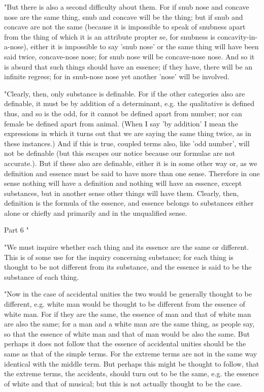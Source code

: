 "But there is also a second difficulty about them. For if snub nose
and concave nose are the same thing, snub and concave will be the
thing; but if snub and concave are not the same (because it is impossible
to speak of snubness apart from the thing of which it is an attribute
propter se, for snubness is concavity-in-a-nose), either it is impossible
to say 'snub nose' or the same thing will have been said twice, concave-nose
nose; for snub nose will be concave-nose nose. And so it is absurd
that such things should have an essence; if they have, there will
be an infinite regress; for in snub-nose nose yet another 'nose' will
be involved. 

"Clearly, then, only substance is definable. For if the other categories
also are definable, it must be by addition of a determinant, e.g.
the qualitative is defined thus, and so is the odd, for it cannot
be defined apart from number; nor can female be defined apart from
animal. (When I say 'by addition' I mean the expressions in which
it turns out that we are saying the same thing twice, as in these
instances.) And if this is true, coupled terms also, like 'odd number',
will not be definable (but this escapes our notice because our formulae
are not accurate.). But if these also are definable, either it is
in some other way or, as we definition and essence must be said to
have more than one sense. Therefore in one sense nothing will have
a definition and nothing will have an essence, except substances,
but in another sense other things will have them. Clearly, then, definition
is the formula of the essence, and essence belongs to substances either
alone or chiefly and primarily and in the unqualified sense.

Part 6 "

"We must inquire whether each thing and its essence are the same or
different. This is of some use for the inquiry concerning substance;
for each thing is thought to be not different from its substance,
and the essence is said to be the substance of each thing.

"Now in the case of accidental unities the two would be generally
thought to be different, e.g. white man would be thought to be different
from the essence of white man. For if they are the same, the essence
of man and that of white man are also the same; for a man and a white
man are the same thing, as people say, so that the essence of white
man and that of man would be also the same. But perhaps it does not
follow that the essence of accidental unities should be the same as
that of the simple terms. For the extreme terms are not in the same
way identical with the middle term. But perhaps this might be thought
to follow, that the extreme terms, the accidents, should turn out
to be the same, e.g. the essence of white and that of musical; but
this is not actually thought to be the case. 

